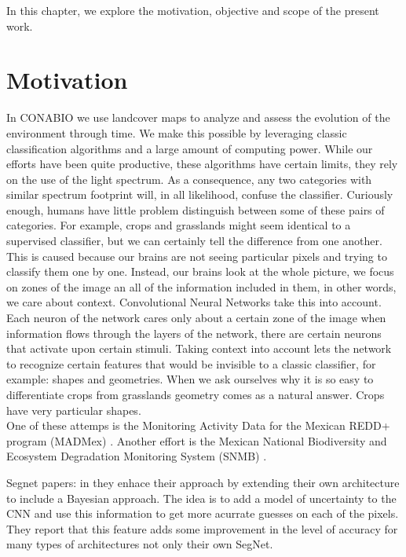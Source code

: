 In this chapter, we explore the motivation, objective and scope of the present work.\\


\section{Motivation}

In CONABIO we use landcover maps to analyze and assess the evolution of the environment through time. We make this possible by leveraging classic classification algorithms and a large amount of computing power. While our efforts have been quite productive, these algorithms have certain limits, they rely on the use of the light spectrum. As a consequence, any two categories with similar spectrum footprint will, in all likelihood, confuse the classifier. Curiously enough, humans have little problem distinguish between some of these pairs of categories. For example, crops and grasslands might seem identical to a supervised classifier, but we can certainly tell the difference from one another. This is caused because our brains are not seeing particular pixels and trying to classify them one by one. Instead, our brains look at the whole picture, we focus on zones of the image an all of the information included in them, in other words, we care about context. Convolutional Neural Networks take this into account. Each neuron of the network cares only about a certain zone of the image when information flows through the layers of the network, there are certain neurons that activate upon certain stimuli. Taking context into account lets the network to recognize certain features that would be invisible to a classic classifier, for example: shapes and geometries. When we ask ourselves why it is so easy to differentiate crops from grasslands geometry comes as a natural answer. Crops have very particular shapes.\\

One of these attemps is the Monitoring Activity Data for the Mexican REDD+ program (MADMex) \cite{rs6053923}. Another effort is the Mexican National Biodiversity and Ecosystem Degradation Monitoring System (SNMB) \cite{GARCIAALANIZ201762}. 

Segnet papers: \cite{DBLP:journals/corr/BadrinarayananK15} in \cite{DBLP:journals/corr/KendallBC15} they enhace their approach by extending their own architecture to include a Bayesian approach. The idea is to add a model of uncertainty to the CNN and use this information to get more acurrate guesses on each of the pixels. They report that this feature adds some improvement in the level of accuracy for many types of architectures not only their own SegNet.


